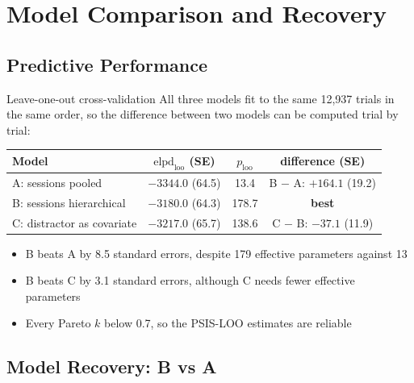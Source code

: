 \section{Model Comparison and Recovery}

\subsection{Predictive Performance}

\begin{frame}{Leave-one-out cross-validation}
  All three models fit to the same 12{,}937 trials in the same order, so the difference
  between two models can be computed trial by trial:
  \vspace{0.6em}

  \centering
  \begin{tabular}{lccc}
    \toprule
    Model & $\text{elpd}_\text{loo}$ (SE) & $p_\text{loo}$ & difference (SE) \\
    \midrule
    A: sessions pooled          & $-3344.0$ (64.5) & 13.4  & B $-$ A: $+164.1$ (19.2) \\
    B: sessions hierarchical    & $-3180.0$ (64.3) & 178.7 & \textbf{best} \\
    C: distractor as covariate  & $-3217.0$ (65.7) & 138.6 & C $-$ B: $-37.1$ (11.9) \\
    \bottomrule
  \end{tabular}

  \vspace{0.6em}
  \raggedright
  \begin{itemize}
    \item B beats A by 8.5 standard errors, despite 179 effective parameters against 13
    \item B beats C by 3.1 standard errors, although C needs fewer effective parameters
    \item Every Pareto $k$ below 0.7, so the PSIS-LOO estimates are reliable
  \end{itemize}
\end{frame}

\subsection{Model Recovery: B vs A}

